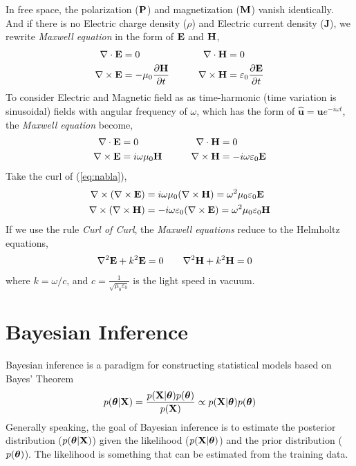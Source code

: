 In free space, the polarization ($\mathbf{P}$) and magnetization ($\mathbf{M}$) vanish identically. And if there is no Electric charge density ($\rho$) and Electric current density ($\mathbf{J}$), we rewrite \textit{Maxwell equation} in the form of $\mathbf{E}$ and $\mathbf{H}$,
\begin{equation}
	\begin{aligned}
		\nabla\cdot\mathbf{E}  &= 0 & & & & & \nabla\cdot\mathbf{H}  &= 0 \\
		\nabla\times\mathbf{E} &= -\mu_0\frac{\partial\mathbf{H}}{\partial t} & & & & & 
		\nabla\times\mathbf{H} &= \varepsilon_0\frac{\partial\mathbf{E}}{\partial t}
  	\end{aligned}
\end{equation}
To consider Electric and Magnetic field as as time-harmonic (time variation is sinusoidal) fields with angular frequency of $\omega$, which has the form of $\mathbf{\hat{u}} = \mathbf{u}e^{-i\omega t}$, the \textit{Maxwell equation} become,
\begin{equation}
	\begin{aligned}
		\nabla\cdot\mathbf{E}  &= 0 & & & & & \nabla\cdot\mathbf{H}  &= 0 \\
		\nabla\times\mathbf{E} &= i\omega\mu_0\mathbf{H} & & & & & 
		\nabla\times\mathbf{H} &= -i\omega\varepsilon_0\mathbf{E} \label{eq:nabla}
	\end{aligned}
\end{equation}
Take the curl of (\ref{eq:nabla}), 
\begin{equation}
	\begin{aligned}
		\nabla\times(\nabla\times\mathbf{E}) &= i\omega\mu_0(\nabla\times\mathbf{H}) = \omega^2\mu_0\varepsilon_0\mathbf{E} \\
		\nabla\times(\nabla\times\mathbf{H}) &= -i\omega\varepsilon_0(\nabla\times\mathbf{E}) = \omega^2\mu_0\varepsilon_0\mathbf{H}
	\end{aligned}
\end{equation}
If we use the rule \emph{Curl of Curl}, the \textit{Maxwell equations} reduce to the Helmholtz equations,
\begin{equation}
	\begin{aligned}
		\nabla^2\mathbf{E} + k^2\mathbf{E} = 0 & & & & & 
		\nabla^2\mathbf{H} + k^2\mathbf{H} = 0
	\end{aligned}
\end{equation}
where $k = \omega/c$, and $c=\frac{1}{\sqrt{\mu_0\varepsilon_0}}$ is the light speed in vacuum. 


\section{Bayesian Inference}
Bayesian inference is a paradigm for constructing statistical models based on Bayes’ Theorem
\begin{equation}
	p(\bm\theta|\mathbf{X}) = \frac{p(\mathbf{X}|\bm\theta)p(\bm\theta)}{p(\mathbf{X})} \propto p(\mathbf{X}|\bm\theta)p(\bm\theta)
\end{equation}
Generally speaking, the goal of Bayesian inference is to estimate the posterior distribution ($p(\bm\theta|\mathbf{X})$) given the likelihood ($p(\mathbf{X}|\bm\theta)$) and the prior distribution ($p(\bm\theta)$). The likelihood is something that can be estimated from the training data. 

